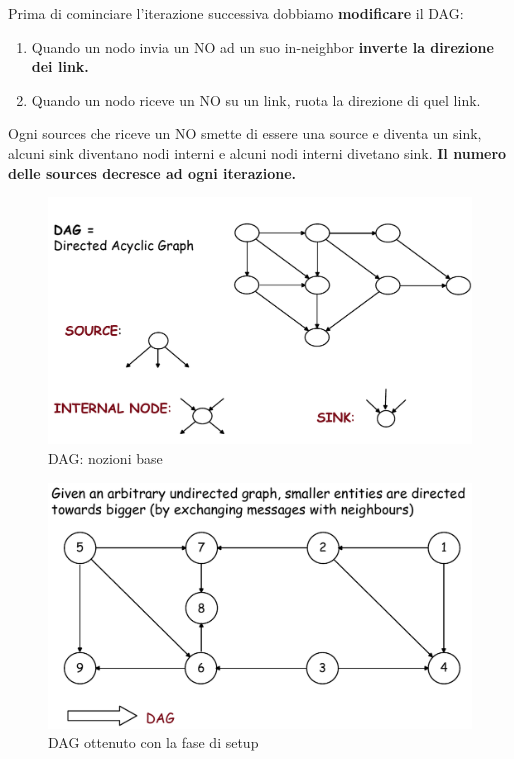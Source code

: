 \documentclass[12pt]{article}
\begin{document}
\begin{itemize}
\begin{enumerate}
				\end{enumerate}
				Prima di cominciare l'iterazione successiva dobbiamo \textbf{modificare} il DAG:
				\begin{enumerate}
					\item Quando un nodo invia un NO ad un suo in-neighbor \textbf{inverte la direzione dei link.}
					\item Quando un nodo riceve un NO su un link, ruota la direzione di quel link.
				\end{enumerate}
				Ogni sources che riceve un NO smette di essere una source e diventa un sink, alcuni sink diventano nodi interni e alcuni nodi interni divetano sink. \textbf{Il numero delle sources decresce ad ogni iterazione.}
			 
			\end{itemize}
		
			\begin{figure}[h!]
				\centering
				\includegraphics[scale=0.30]{img/dag.png}
				\caption{DAG: nozioni base}
			\end{figure}
			\begin{figure}[h!]
				\centering
				\includegraphics[scale=0.30]{img/dpi.png}
				\caption{DAG ottenuto con la fase di setup}
			\end{figure}
		
\end{document}
